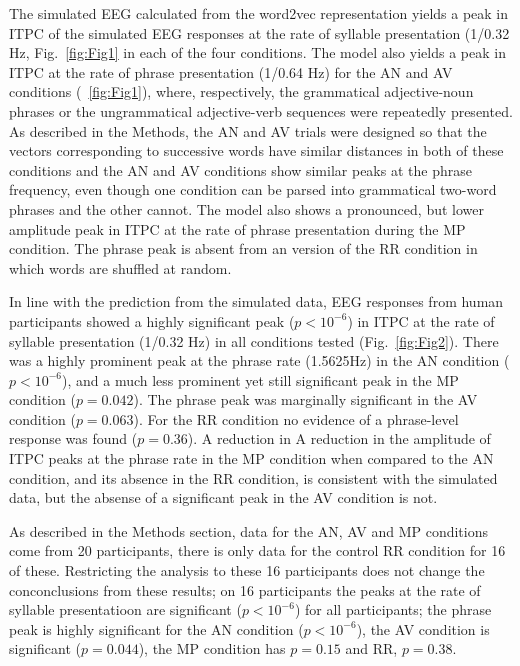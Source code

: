 \documentclass[10pt,letterpaper]{article}
\begin{document}
The simulated EEG calculated from the word2vec representation yields a
peak in ITPC of the simulated EEG responses at the rate of syllable
presentation (1/0.32 Hz, Fig.~\ref{fig:Fig1} in each of the four
conditions. The model also yields a peak in ITPC at the rate of phrase
presentation (1/0.64 Hz) for the AN and AV conditions
(~\ref{fig:Fig1}), where, respectively, the grammatical adjective-noun
phrases or the ungrammatical adjective-verb sequences were repeatedly
presented. As described in the Methods, the AN and AV trials were
designed so that the vectors corresponding to successive words have
similar distances in both of these conditions and the AN and AV
conditions show similar peaks at the phrase frequency, even though one
condition can be parsed into grammatical two-word phrases and the
other cannot. The model also shows a pronounced, but lower amplitude
peak in ITPC at the rate of phrase presentation during the MP
condition. The phrase peak is absent from an version of the RR condition in which
words are shuffled at random.

In line with the prediction from the simulated data, EEG responses
from human participants showed a highly significant peak ($p<10^{-6}$)
in ITPC at the rate of syllable presentation (1/0.32 Hz) in all
conditions tested (Fig.~\ref{fig:Fig2}). There was a highly prominent
peak at the phrase rate (1.5625Hz) in the AN condition ($p<10^{-6}$),
and a much less prominent yet still significant peak in the MP
condition ($p=0.042$). The phrase peak was marginally significant in
the AV condition ($p=0.063$). For the RR condition no evidence of a
phrase-level response was found ($p=0.36$). A reduction in A reduction
in the amplitude of ITPC peaks at the phrase rate in the MP condition
when compared to the AN condition, and its absence in the RR
condition, is consistent with the simulated data, but the absense of a
significant peak in the AV condition is not.

As described in the Methods section, data for the AN, AV and MP
conditions come from 20 participants, there is only data for the
control RR condition for 16 of these. Restricting the analysis to
these 16 participants does not change the conconclusions from these
results; on 16 participants the peaks at the rate of syllable
presentatioon are significant ($p<10^{-6}$) for all participants; the
phrase peak is highly significant for the AN condition ($p<10^{-6}$),
the AV condition is significant ($p=0.044$), the MP condition has
$p=0.15$ and RR, $p=0.38$.
\end{document}
